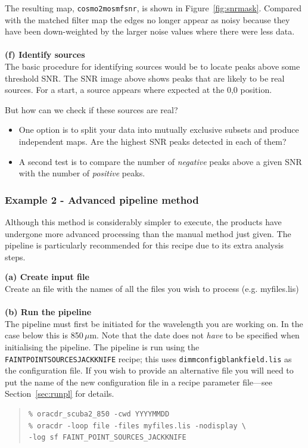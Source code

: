 \documentclass[twoside,11pt]{article}
\newcommand{\htmlref}[2]{#1}
\newcommand{\latexhtml}[2]{#1}
\newcommand{\xref}[3]{#1}
\renewcommand{\_}{\texttt{\symbol{95}}}
\newenvironment{myquote}{\begin{quote}\begin{small}}{\end{small}\end{quote}}
\newcommand{\drrecipe}[1]{\texttt{#1}}
\newcommand{\cref}[3]{\latexhtml{#1~\ref{#2}}{\htmlref{#3}{#2}}}
\begin{document}
The resulting map, \texttt{cosmo2\_mos\_mf\_snr}, is shown in
\cref{Figure}{fig:snrmask}{signal-to-noise image}. Compared with the
matched filter map the
edges no longer appear as noisy because they have been down-weighted
by the larger noise values where there were less data.
\\ \\
\textbf{(f) Identify sources}\\
The basic procedure for identifying sources would be to locate peaks
above some threshold SNR. The SNR image above shows peaks that are
likely to be real sources. For a start, a source appears where
expected at the 0,0 position.

But how can we check if these sources are real?
\begin{itemize}

\item One option is to split your data into mutually exclusive subsets
  and produce independent maps. Are the highest SNR peaks detected in each of
  them?
\item A second test is to compare the number of {\em negative} peaks above
  a given SNR with the number of {\em positive} peaks.
\end{itemize}

\subsubsection{Example 2 - Advanced pipeline method}
\label{sec:jk}

Although this method is considerably simpler to execute, the products
have undergone more advanced processing than the manual method just
given. The pipeline is particularly recommended for this recipe due to
its extra analysis steps.

\textbf{(a) Create input file}\\
Create an file with the names of all the files you wish to process (e.g. myfiles.lis)
\\ \\
\textbf{(b) Run the pipeline}\\
The pipeline must first be initiated for the wavelength you are
working on. In the case below this is 850\,$\mu$m. Note that the date
does not \emph{have} to be specified when initialising the pipeline.
The pipeline is run using the
\xref{\drrecipe{FAINT\_POINT\_SOURCES\_JACKKNIFE}}{sun265}{FAINT_POINT_SOURCES_JACKKNIFE}
recipe; this uses \texttt{dimmconfig\_blank\_field.lis} as the
configuration file. If you wish to provide an alternative file you
will need to put the name of the new configuration file in a recipe
parameter file---see \cref{Section}{sec:runpl}{The SCUBA-2 Pipeline}
for details.
\begin{myquote}
\begin{verbatim}
% oracdr_scuba2_850 -cwd YYYYMMDD
% oracdr -loop file -files myfiles.lis -nodisplay \
-log sf FAINT_POINT_SOURCES_JACKKNIFE
\end{verbatim}
\end{myquote}
\end{document}
